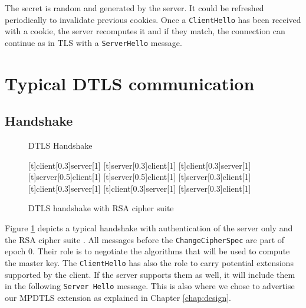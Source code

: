 The secret is random and generated by the server. It could be refreshed periodically to invalidate previous cookies. Once a \texttt{ClientHello} has been received with a cookie, the server recomputes it and if they match, the connection can continue as in TLS with a \texttt{ServerHello} message.

\section{Typical DTLS communication}

\subsection{Handshake}

\begin{figure}[!h]
\centering
\begin{msc}[r]{DTLS Handshake}

\setlength{\instfootheight}{0em}
\setlength{\instheadheight}{0em}
\setlength{\instdist}{0.7\linewidth}
\setlength{\levelheight}{3em}


[t]{client}[0.3]{server}[1]
\nextlevel
{}[t]{server}[0.3]{client}[1]
\nextlevel
{}[t]{client}[0.3]{server}[1]
\nextlevel
{}[t]{server}[0.5]{client}[1]
\nextlevel
{}[t]{server}[0.5]{client}[1]
\nextlevel
{}[t]{server}[0.3]{client}[1]
\nextlevel
{}[t]{client}[0.3]{server}[1]
\nextlevel
{}[t]{client}[0.3]{server}[1]
\nextlevel
{}[t]{server}[0.3]{client}[1]
\nextlevel
\nextlevel
\end{msc}
\caption{DTLS handshake with RSA cipher suite}
\label{fig:dtls-handshake}
\end{figure}


Figure \ref{fig:dtls-handshake} depicts a typical handshake with authentication of the server only and the RSA cipher suite . All messages before the \texttt{ChangeCipherSpec} are part of epoch 0. Their role is to negotiate the algorithms that will be used to compute the master key. The \texttt{ClientHello} has also the role to carry potential extensions supported by the client. If the server supports them as well, it will include them in the following \texttt{Server Hello} message. This is also where we chose to advertise our MPDTLS extension as explained in Chapter \ref{chap:design}.


